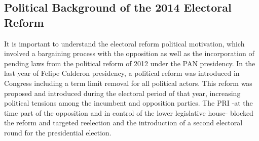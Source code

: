  
      

\clearpage
\begin{appendix}


\section{Political Background of the 2014 Electoral Reform}\label{appendix:reform_backgorund}


It is important to understand the electoral reform political motivation, which involved a bargaining process with the opposition as well as the incorporation of pending laws from the political reform of 2012 under the PAN presidency. In the last year of Felipe Calderon presidency, a political reform was introduced in Congress including a term limit removal for all political actors. This reform was proposed and introduced during the electoral period of that year, increasing political tensions among the incumbent and opposition parties. The PRI -at the time part of the opposition and in control of the lower legislative house- blocked the reform and targeted reelection and the introduction of a second electoral round for the presidential election. 
 

\end{appendix}
